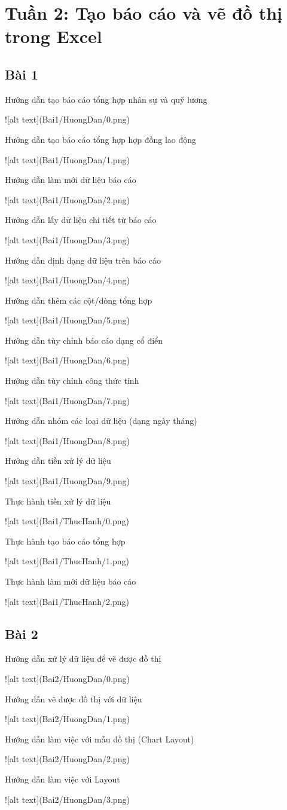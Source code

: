 \documentclass{article}
\begin{document}
\tableofcontents
\newpage
\listoffigures
\newpage
\section{Tuần 2:  Tạo báo cáo và vẽ đồ thị trong Excel}  
\subsection{Bài 1}  

\caption{Hướng dẫn tạo báo cáo tổng hợp nhân sự và quỹ lương}
![alt text](Bai1/HuongDan/0.png)
\caption{Hướng dẫn tạo báo cáo tổng hợp hợp đồng lao động}
![alt text](Bai1/HuongDan/1.png)
\caption{Hướng dẫn làm mới dữ liệu báo cáo}
![alt text](Bai1/HuongDan/2.png)
\caption{Hướng dẫn lấy dữ liệu chi tiết từ báo cáo}
![alt text](Bai1/HuongDan/3.png)
\caption{Hướng dẫn định dạng dữ liệu trên báo cáo}
![alt text](Bai1/HuongDan/4.png)
\caption{Hướng dẫn thêm các cột/dòng tổng hợp}
![alt text](Bai1/HuongDan/5.png)
\caption{Hướng dẫn tùy chỉnh báo cáo dạng cổ điển}
![alt text](Bai1/HuongDan/6.png)
\caption{Hướng dẫn tùy chỉnh công thức tính}
![alt text](Bai1/HuongDan/7.png)
\caption{Hướng dẫn nhóm các loại dữ liệu (dạng ngày tháng)}
![alt text](Bai1/HuongDan/8.png)
\caption{Hướng dẫn tiền xử lý dữ liệu}
![alt text](Bai1/HuongDan/9.png)

\caption{Thực hành tiền xử lý dữ liệu}
![alt text](Bai1/ThucHanh/0.png)
\caption{Thực hành tạo báo cáo tổng hợp}
![alt text](Bai1/ThucHanh/1.png)
\caption{Thực hành làm mới dữ liệu báo cáo}
![alt text](Bai1/ThucHanh/2.png)
\subsection{Bài 2}

\caption{Hướng dẫn xử lý dữ liệu để vẽ được đồ thị }
![alt text](Bai2/HuongDan/0.png)

\caption{Hướng dẫn vẽ được đồ thị với dữ liệu}
![alt text](Bai2/HuongDan/1.png)

\caption{Hướng dẫn làm việc với mẫu đồ thị (Chart Layout)}
![alt text](Bai2/HuongDan/2.png)

\caption{Hướng dẫn làm việc với Layout}
![alt text](Bai2/HuongDan/3.png)
\end{document}

